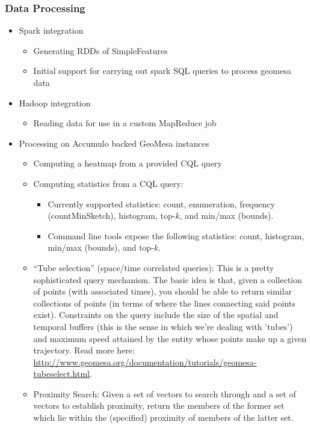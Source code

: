 \subsubsection*{Data Processing}

\begin{itemize}
\item{Spark integration
  \begin{itemize}
  \item Generating RDDs of SimpleFeatures
  \item Initial support for carrying out spark SQL queries to process geomesa data
  \end{itemize}
}
\item{Hadoop integration
  \begin{itemize}
    \item Reading data for use in a custom MapReduce job
  \end{itemize}
}
\item{Processing on Accumulo backed GeoMesa instances
  \begin{itemize}
  \item Computing a heatmap from a provided CQL query
  \item {
    Computing statistics from a CQL query:
    \begin{itemize}
    \item Currently supported statistics: count, enumeration, frequency (countMinSketch), histogram, top-$k$, and min/max (bounds).
    \item Command line tools expose the following statistics: count, histogram, min/max (bounds), and top-$k$.
    \end{itemize}
    }
  \item{
    ``Tube selection'' (space/time correlated queries): This is a pretty sophisticated query mechanism.
    The basic idea is that, given a collection of points (with associated times),
    you should be able to return similar collections of points (in terms of where the lines connecting said points exist).
    Constraints on the query include the size of the spatial and temporal buffers (this is the sense in which we're dealing with 'tubes') and maximum speed attained by the entity whose points make up a given trajectory.
    Read more here: \url{http://www.geomesa.org/documentation/tutorials/geomesa-tubeselect.html}.
  }
  \item{
    Proximity Search: Given a set of vectors to search through and a set of vectors to establish proximity,
    return the members of the former set which lie within the (specified) proximity of members of the latter set.
}
\end{itemize}}
\end{itemize}
